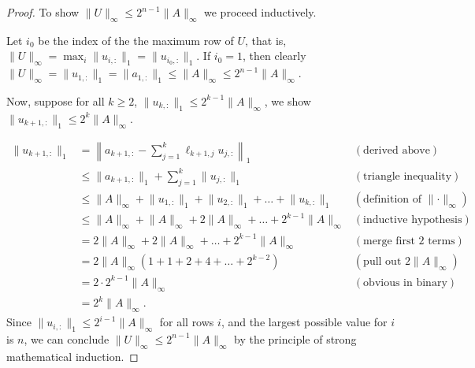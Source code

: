 \documentclass[11pt]{article}
\begin{document}
\begin{enumerate}
\begin{proof}
		      To show \(\lVert U \rVert_\infty \leq 2^{n-1}\lVert A \rVert_\infty\) we proceed inductively.

		      Let \(i_0\) be the index of the the maximum row of \(U\), that is, \(\lVert U \rVert_\infty = \max_i \lVert u_{i,:} \rVert_1 = \lVert u_{i_0,:} \rVert_1\).  If \(i_0 = 1\), then clearly \(\lVert U \rVert_\infty = \lVert u_{1,:} \rVert_1 = \lVert a_{1,:} \rVert_1 \leq \lVert A \rVert_\infty \leq 2^{n-1}\lVert A \rVert_\infty\).

		      Now, suppose for all \(k \geq 2\), \(\lVert u_{k,:} \rVert_1 \leq 2^{k-1}\lVert A \rVert_\infty\), we show \(\lVert u_{k+1,:} \rVert_1 \leq 2^k \lVert A \rVert_\infty.\)

		      \begin{align*}
			      \lVert u_{k+1,:} \rVert_1 & = \left\lVert a_{k+1,:} - \sum_{j=1}^k \ell_{k+1,j} u_{j,:} \right\rVert_1                                              & (\text{derived above})                             \\
			                                & \leq \lVert a_{k+1,:} \rVert_1 + \sum_{j=1}^k \lVert u_{j,:} \rVert_1                                                   & (\text{triangle inequality})                       \\
			                                & \leq \lVert A \rVert_\infty + \lVert u_{1,:} \rVert_1 + \lVert u_{2,:} \rVert_1 + \dots + \lVert u_{k,:} \rVert_1       & (\text{definition of } \lVert \cdot \rVert_\infty) \\
			                                & \leq \lVert A \rVert_\infty + \lVert A \rVert_\infty + 2\lVert A \rVert_\infty + \dots + 2^{k-1}\lVert A  \rVert_\infty & (\text{inductive hypothesis})                      \\
			                                & = 2\lVert A \rVert_\infty + 2\lVert A \rVert_\infty + \dots + 2^{k-1}\lVert A \rVert_\infty                             & (\text{merge first 2 terms})                       \\
			                                & = 2\lVert A \rVert_\infty \left( 1 + 1 + 2 + 4 + \dots + 2^{k-2}\right)                                                 & (\text{pull out } 2 \lVert A \rVert_\infty)        \\
			                                & = 2 \cdot 2^{k-1} \lVert A \rVert_\infty                                                                                & (\text{obvious in binary})                         \\
			                                & = 2^k \lVert A \rVert_\infty.                                                                                           &
		      \end{align*}
		      Since \(\lVert u_{i,:} \rVert_1 \leq 2^{i-1} \lVert A \rVert_\infty\) for all rows \(i\), and the largest possible value for \(i\) is \(n\), we can conclude \(\lVert U \rVert_\infty \leq 2^{n-1}\lVert A \rVert_\infty\) by the principle of strong mathematical induction.
	      \end{proof}



\end{enumerate}
\end{document}
